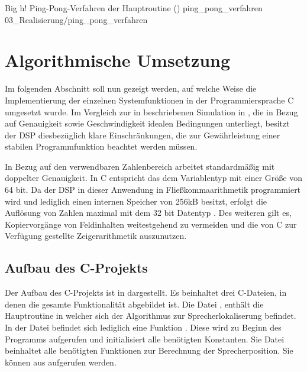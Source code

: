          {Big}                                                       %
         {h!}                                                  %
         {Ping-Pong-Verfahren der Hauptroutine (\vgl \cite[S. 35]{Master_Array_Pikora})}    %
         {ping_pong_verfahren}                                               %
         {03_Realisierung/ping_pong_verfahren}



\section{Algorithmische Umsetzung}
\label{sec:AlgorithmischeUmsetzung}
Im folgenden Abschnitt soll nun gezeigt werden, auf welche Weise die Implementierung der einzelnen Systemfunktionen in der Programmiersprache C umgesetzt wurde. Im Vergleich zur in  beschriebenen Simulation in \matlab, die in Bezug auf Genauigkeit sowie Geschwindigkeit idealen Bedingungen unterliegt, besitzt der DSP diesbezüglich klare Einschränkungen, die zur Gewährleistung einer stabilen Programmfunktion beachtet werden müssen.

In Bezug auf den verwendbaren Zahlenbereich arbeitet \matlab standardmäßig mit doppelter Genauigkeit. In C entspricht das dem Variablentyp  mit einer Größe von 64 bit. Da der DSP in dieser Anwendung in Fließkommaarithmetik programmiert wird und lediglich einen internen Speicher von 256kB besitzt, erfolgt die Auflösung von Zahlen maximal mit dem 32 bit Datentyp . Des weiteren gilt es, Kopiervorgänge von Feldinhalten weitestgehend zu vermeiden und die von C zur Verfügung gestellte Zeigerarithmetik auszunutzen. 


\subsection{Aufbau des C-Projekts}
Der Aufbau des C-Projekts ist in  dargestellt. Es beinhaltet drei C-Dateien, in denen die gesamte Funktionalität abgebildet ist. Die Datei , enthält die Hauptroutine  in welcher sich der Algorithmus zur Sprecherlokaliserung befindet. In der Datei  befindet sich lediglich eine Funktion . Diese wird zu Beginn des Programms aufgerufen und initialisiert alle benötigten Konstanten. Sie Datei  beinhaltet alle benötigten Funktionen zur Berechnung der Sprecherposition. Sie können aus  aufgerufen werden.

